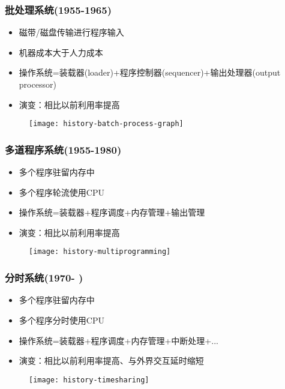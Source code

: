 \begin{frame}
	
	\frametitle{批处理系统(1955-1965)}
	
	
	\begin{itemize}
		\item 磁带/磁盘传输进行程序输入
		\item 机器成本大于人力成本	
		\item 操作系统=装载器(loader)+程序控制器(sequencer)+输出处理器(output processor)
		\item 演变：相比以前利用率提高
	\end{itemize}
	
	\begin{figure}
		\centering
		\texttt{[image: history-batch-process-graph]}
	\end{figure}
	
\end{frame}




\begin{frame}[plain]
	
	\frametitle{多道程序系统(1955-1980)}
	
	
	\begin{itemize}
		\item 多个程序驻留内存中
		\item 多个程序轮流使用CPU	
		\item 操作系统=装载器+程序调度+内存管理+输出管理
		\item 演变：相比以前利用率提高
	\end{itemize}
	
	\begin{figure}
		\centering
		\texttt{[image: history-multiprogramming]}
	\end{figure}
	
\end{frame}


\begin{frame}[plain]
	
	\frametitle{分时系统(1970- )}
	
	
	\begin{itemize}
		\item 多个程序驻留内存中
		\item 多个程序分时使用CPU	
		\item 操作系统=装载器+程序调度+内存管理+中断处理+...
		\item 演变：相比以前利用率提高、与外界交互延时缩短
	\end{itemize}
	
	\begin{figure}
		\centering
		\texttt{[image: history-timesharing]}
	\end{figure}
	
\end{frame}

